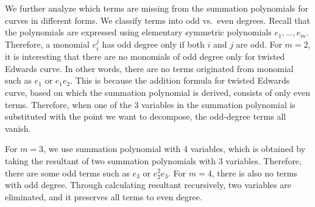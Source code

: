 

We further analyze which terms are missing from the summation
polynomials for curves in different forms.
%
We classify terms into odd vs.~even degrees.
%
Recall that the polynomials are expressed using elementary symmetric polynomials 
$e_1, \dots ,e_m$.
%
Therefore, a monomial $e_i^j$ has odd degree only if both $i$ and $j$
are odd.
%
For $m=2$, it is interesting that there are no monomials of odd degree
only for twisted Edwards curve.
%
In other words, there are no terms originated from monomial such as
$e_1$ or $e_1e_2$.
%
This is because the addition formula for twisted Edwards curve, based
on which the summation polynomial is derived, consists of only even
terms.
%
Therefore, when one of the 3 variables in the summation polynomial is
substituted with the point we want to decompose, the odd-degree terms
all vanish.

For $m=3$, we use summation polynomial with 4 variables, which is
obtained by taking the resultant of two summation polynomials 
with 3 variables.
%
Therefore, there are some odd terms such as $e_3$ or $e_2^2e_3$.
%
For $m=4$, there is also no terms with odd degree.
%
Through calculating resultant recursively, two variables are
eliminated, and it preserves all terms to even degree.

